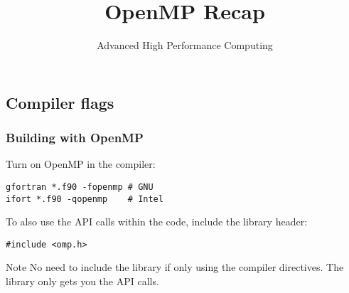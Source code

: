 \documentclass{beamer}
\title{OpenMP Recap}
\subtitle{Advanced High Performance Computing}
\begin{document}
\frame{\titlepage}

\subsection{Compiler flags}
\begin{frame}[fragile]
\frametitle{Building with OpenMP}

Turn on OpenMP in the compiler:
\begin{verbatim}
gfortran *.f90 -fopenmp # GNU
ifort *.f90 -qopenmp    # Intel
\end{verbatim}

To also use the API calls within the code, include the library header:
\begin{verbatim}
#include <omp.h>
\end{verbatim}

\begin{alertblock}{Note}
No need to include the library if only using the compiler directives.
The library only gets you the API calls.
\end{alertblock}
\end{frame}

\end{document}
